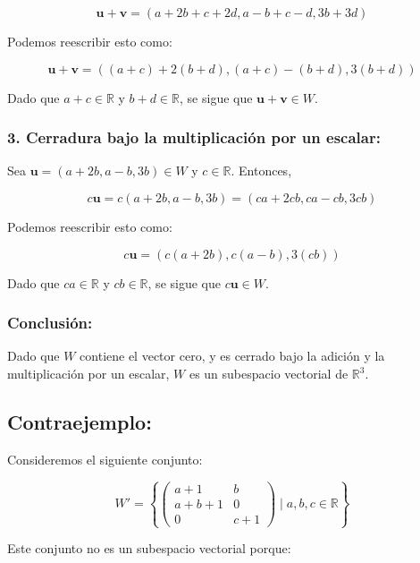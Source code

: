 \documentclass{article}
\begin{document}
\[
\mathbf{u} + \mathbf{v} = (a + 2b + c + 2d, a - b + c - d, 3b + 3d)
\]

Podemos reescribir esto como:

\[
\mathbf{u} + \mathbf{v} = ((a + c) + 2(b + d), (a + c) - (b + d), 3(b + d))
\]

Dado que \(a + c \in \mathbb{R}\) y \(b + d \in \mathbb{R}\), se sigue que \(\mathbf{u} + \mathbf{v} \in W\).

\subsubsection*{3. Cerradura bajo la multiplicación por un escalar:}

Sea \(\mathbf{u} = (a + 2b, a - b, 3b) \in W\) y \(c \in \mathbb{R}\). Entonces,

\[
c\mathbf{u} = c(a + 2b, a - b, 3b) = (ca + 2cb, ca - cb, 3cb)
\]

Podemos reescribir esto como:

\[
c\mathbf{u} = (c(a + 2b), c(a - b), 3(cb))
\]

Dado que \(ca \in \mathbb{R}\) y \(cb \in \mathbb{R}\), se sigue que \(c\mathbf{u} \in W\).

\subsubsection*{Conclusión:}

Dado que \(W\) contiene el vector cero, y es cerrado bajo la adición y la multiplicación por un escalar, \(W\) es un subespacio vectorial de \(\mathbb{R}^3\).

\subsection*{Contraejemplo:}

Consideremos el siguiente conjunto:

\[ W' = \left\{ \begin{pmatrix} a+1 & b \\ a+b+1 & 0 \\ 0 & c+1 \end{pmatrix} \mid a, b, c \in \mathbb{R} \right\} \]

Este conjunto no es un subespacio vectorial porque:
\end{document}
